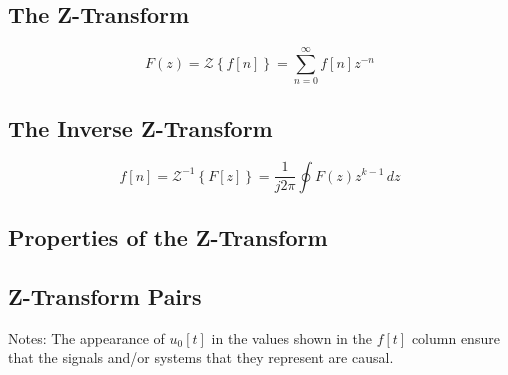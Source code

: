 \subsection*{The Z-Transform}

$$
F(z) = \mathcal{Z}\left\{f[n]\right\} = \sum_{n=0}^{\infty} f[n]z^{-n}
$$

\subsection*{The Inverse Z-Transform}

$$
f[n] = \mathcal{Z}^{-1}\left\{F[z]\right\} = \frac{1}{j2\pi}\oint F(z)z^{k-1}\,dz 
$$

\subsection*{Properties of the Z-Transform}

\subsection*{Z-Transform Pairs}
Notes: The appearance of $u_0[t]$ in the values shown in the $f[t]$ column ensure that 
the signals and/or systems that they represent are causal.
    
\endinput
